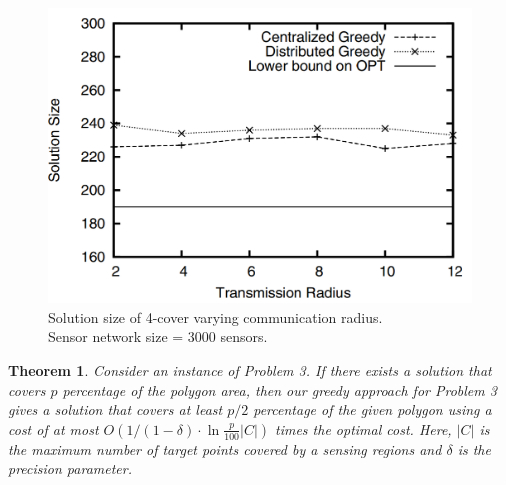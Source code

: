 \documentclass[conference]{IEEEtran}
\newtheorem{theorem}{Theorem}
\theoremstyle{definition}
\newtheorem*{NP-Hardness of Approximating the SODkC Problem}{NP-Hardness of Approximating the SODkC Problem}
\newtheorem*{Greedy Algorithm (GA)}{Greedy Algorithm (GA)}
\newtheorem*{GA on the Running Example}{GA on the Running Example}
\newtheorem*{Performance Guarantee of GA}{Performance Guarantee of GA}
\begin{document}
\begin{figure}[t]
    \centering
    \includegraphics[width=0.7\columnwidth]{6.png}
    \caption{Solution size of 4-cover varying communication radius.\\ Sensor network size = 3000 sensors.}
    \label{fig:enter-label}
\end{figure}

\begin{theorem}
Consider an instance of Problem 3. If there exists a solution that covers $p$ percentage of the polygon area, then our greedy approach for Problem 3 gives a solution that covers at least $p/2$ percentage of the given polygon using a cost of at most $O(1/(1 - \delta) \cdot \ln \frac{p}{100}|C|)$ times the optimal cost. Here, $|C|$ is the maximum number of target points covered by a sensing regions and $\delta$ is the precision parameter.
\end{theorem}
\end{document}
